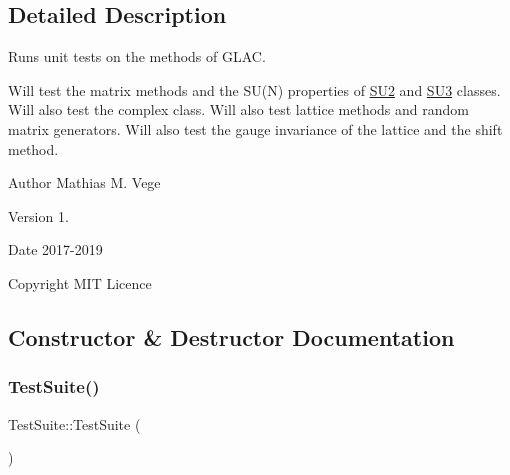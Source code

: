 \subsection{Detailed Description}
Runs unit tests on the methods of G\+L\+AC. 

Will test the matrix methods and the S\+U(\+N) properties of \mbox{\hyperlink{class_s_u2}{S\+U2}} and \mbox{\hyperlink{class_s_u3}{S\+U3}} classes. Will also test the complex class. Will also test lattice methods and random matrix generators. Will also test the gauge invariance of the lattice and the shift method.

\begin{DoxyAuthor}{Author}
Mathias M. Vege 
\end{DoxyAuthor}
\begin{DoxyVersion}{Version}
1. 
\end{DoxyVersion}
\begin{DoxyDate}{Date}
2017-\/2019 
\end{DoxyDate}
\begin{DoxyCopyright}{Copyright}
M\+IT Licence 
\end{DoxyCopyright}


\subsection{Constructor \& Destructor Documentation}
\mbox{\label{class_test_suite_af7291e6d8b53443604ee0c1fcf1fadfc}} 
\subsubsection{\texorpdfstring{TestSuite()}{TestSuite()}}
{\footnotesize\ttfamily Test\+Suite\+::\+Test\+Suite (\begin{DoxyParamCaption}{ }\end{DoxyParamCaption})}

